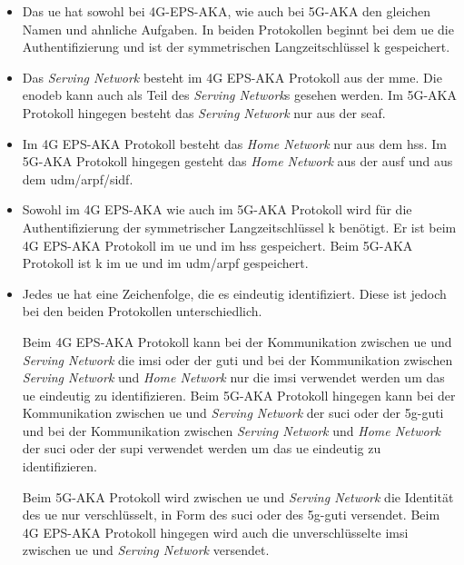 \begin{itemize}
\item Das \gls{ue} hat sowohl bei 4G-EPS-AKA, wie auch bei 5G-AKA den gleichen Namen und ahnliche Aufgaben.
In beiden Protokollen beginnt bei dem \gls{ue} die Authentifizierung und ist der symmetrischen Langzeitschlüssel \gls{k} gespeichert.

\item Das \textit{Serving Network} besteht im 4G EPS-AKA Protokoll aus der \gls{mme}. 
Die \gls{enodeb} kann auch als Teil des \textit{Serving Network}s gesehen werden.
Im 5G-AKA Protokoll hingegen besteht das \textit{Serving Network} nur aus der \gls{seaf}.

\item Im 4G EPS-AKA Protokoll besteht das \textit{Home Network} nur aus dem \gls{hss}.
Im 5G-AKA Protokoll hingegen gesteht das \textit{Home Network} aus der \gls{ausf} und aus dem \gls{udm}/\gls{arpf}/\gls{sidf}.

\item Sowohl im 4G EPS-AKA wie auch im 5G-AKA Protokoll wird für die Authentifizierung der symmetrischer Langzeitschlüssel \gls{k} benötigt.
Er ist beim 4G EPS-AKA Protokoll im \gls{ue} und im \gls{hss} gespeichert.
Beim 5G-AKA Protokoll ist \gls{k} im \gls{ue} und im \gls{udm}/\gls{arpf} gespeichert.

\item Jedes \gls{ue} hat eine Zeichenfolge, die es eindeutig identifiziert.
Diese ist jedoch bei den beiden Protokollen unterschiedlich.

Beim 4G EPS-AKA Protokoll kann bei der Kommunikation zwischen \gls{ue} und \textit{Serving Network} die \gls{imsi} oder der \gls{guti} und bei der Kommunikation zwischen \textit{Serving Network} und \textit{Home Network} nur die \gls{imsi} verwendet werden um das \gls{ue} eindeutig zu identifizieren.
Beim 5G-AKA Protokoll hingegen kann bei der Kommunikation zwischen \gls{ue} und \textit{Serving Network} der \gls{suci} oder der \gls{5g-guti} und bei der Kommunikation zwischen \textit{Serving Network} und \textit{Home Network} der \gls{suci} oder der \gls{supi} verwendet werden um das \gls{ue} eindeutig zu identifizieren.

Beim 5G-AKA Protokoll wird zwischen \gls{ue} und \textit{Serving Network} die Identität des \gls{ue} nur verschlüsselt, in Form des \gls{suci} oder des \gls{5g-guti} versendet. Beim 4G EPS-AKA Protokoll hingegen wird auch die unverschlüsselte \gls{imsi} zwischen \gls{ue} und \textit{Serving Network} versendet.


\end{itemize}
